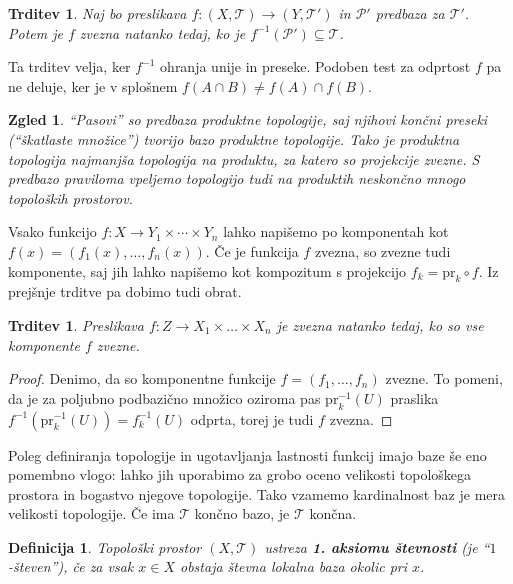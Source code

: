 \documentclass[10pt, a4paper]{article}
\newtheorem{trditev}[izr]{Trditev}
\newtheorem{defi}{Definicija}[section]
\newenvironment{noticeB}{%
  \tcolorbox[%
  notitle,
  empty,
  enhanced,  %
  breakable,
  coltext=black,
  colback=white, 
  fontupper=\rmfamily,
  parbox=false,
  noparskip,
  sharp corners,
  boxrule=-1pt,  %
  frame hidden,
  left=7pt,  %
  right=7pt,
  top=5pt,
  bottom=5pt,
  before skip=2.5ex plus 2pt,
  after skip=2.5ex plus 2pt,
  borderline west = {1.5pt}{-0.1pt}{blue!30!black}, %
  overlay unbroken and last={%
    \draw[color=black, line width=1.25pt]
    ($(frame.south west)+(1.pt, -0.1pt)$) -- ++(2em, 0);
  }
  ]}
{\endtcolorbox}
\newenvironment{definicija}{\begin{defi}\begin{noticeB}}{%
    \end{noticeB}\end{defi}}
\newtheorem{zgled}{Zgled}[section]
\newenvironment{noticeC}{%
  \tcolorbox[%
  notitle,
  empty,
  enhanced,  %
  breakable,
  coltext=black, 
  fontupper=\rmfamily,
  parbox=false,
  noparskip,
  sharp corners,
  boxrule=-1pt,  %
  frame hidden,
  left=7pt,  %
  right=7pt,
  top=5pt,
  bottom=5pt,
  before skip=2.5ex plus 2pt,
  after skip=2.5ex plus 2pt,
  overlay unbroken and last={%
  },
  ]}
{\endtcolorbox}
\newenvironment{dokaz}%
  {\begin{noticeC}\begin{proof}}%
  {\end{proof}\end{noticeC}}
\begin{document}
\begin{trditev}
  Naj bo preslikava $f: (X, \mathcal{T}) \to (Y, \mathcal{T}')$ in $\mathcal{P}'$ predbaza za $\mathcal{T}'$.
  Potem je $f$ zvezna natanko tedaj, ko je $f^{-1} (\mathcal{P}') \subseteq \mathcal{T}$.
\end{trditev}

Ta trditev velja, ker $f^{-1}$ ohranja unije in preseke.
Podoben test za odprtost $f$ pa ne deluje, ker je v splošnem $f(A \cap B) \neq f(A) \cap f(B)$.

\begin{zgled}
  "`Pasovi"' so predbaza produktne topologije, saj njihovi končni preseki ("`škatlaste množice"') tvorijo 
  bazo produktne topologije. Tako je produktna topologija najmanjša topologija na produktu, za katero so projekcije zvezne.
  S predbazo praviloma vpeljemo topologijo tudi na produktih neskončno mnogo topoloških prostorov.
\end{zgled}

Vsako funkcijo $f: X \to Y_1 \times \cdots \times Y_n$ lahko napišemo po komponentah kot $f (x) = (f_1 (x), \dots, f_n (x))$.
Če je funkcija $f$ zvezna, so zvezne tudi komponente, saj jih lahko napišemo kot kompozitum s projekcijo $f_k = \mathrm{pr}_k \circ f$.
Iz prejšnje trditve pa dobimo tudi obrat.

\begin{trditev}
  Preslikava $f: Z \to X_1 \times \dots \times X_n$ je zvezna natanko tedaj, ko so vse komponente $f$ zvezne.
\end{trditev}

\begin{dokaz}
  Denimo, da so komponentne funkcije $f = (f_1, \dots, f_n)$ zvezne.
  To pomeni, da je za poljubno podbazično množico oziroma pas $\mathrm{pr}_k ^{-1} (U)$ praslika $f^{-1} (\mathrm{pr}_k ^{-1} (U)) = f_k ^{-1} (U)$ odprta,
  torej je tudi $f$ zvezna.
\end{dokaz}

Poleg definiranja topologije in ugotavljanja lastnosti funkcij imajo 
baze še eno pomembno vlogo: lahko jih uporabimo za grobo oceno velikosti topološkega prostora 
in bogastvo njegove topologije.
Tako vzamemo kardinalnost baz je mera velikosti topologije.
Če ima $\mathcal{T}$ končno bazo, je $\mathcal{T}$ končna.

\begin{definicija}
  Topološki prostor $(X, \mathcal{T})$ ustreza \textbf{1. aksiomu števnosti} (je "`$1$-števen"'),
  če za vsak $x \in X$ obstaja števna lokalna baza okolic pri $x$.
\end{definicija}
\end{document}

